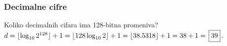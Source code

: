 \subsubsection{Decimalne cifre}
\zadatak Koliko decimalnih cifara ima 128-bitna promen{\lj}iva?
\resenje $d=\lfloor\logten 2^{128}\rfloor+1=\lfloor 128\logten 2\rfloor+1=\lfloor 38.5318\rfloor+1=38+1=\ram{39}.$
